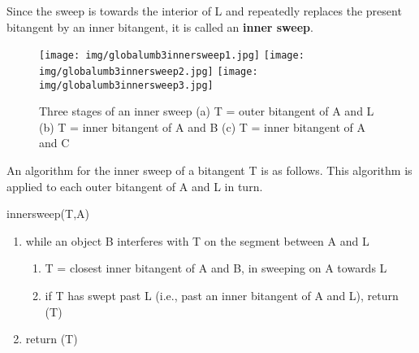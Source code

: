 \documentclass[9pt,twocolumn]{article}
\newif\ifJournal
\begin{document}

\ifJournal
  In this case, the global umbra of A is set to the penumbra of A,
  which is declared to be the maximal size of the global umbra.\footnote{The only
    points that can be blocked from L by A are the points inside the
    penumbra of A.  The responsibility for blocking L is rightly passed
    to another object when the point leaves A's penumbra.}
\fi

Since the sweep is towards the interior of L and repeatedly 
replaces the present bitangent by an inner bitangent,
it is called an {\bf inner sweep}.

\begin{figure}
\begin{center}
\texttt{[image: img/globalumb3innersweep1.jpg]}
\texttt{[image: img/globalumb3innersweep2.jpg]}
\texttt{[image: img/globalumb3innersweep3.jpg]}
\end{center}
\caption{Three stages of an inner sweep
	 (a) T = outer bitangent of A and L
	 (b) T = inner bitangent of A and B
	 (c) T = inner bitangent of A and C}
\label{fig:innersweep}
\end{figure}

An algorithm for the inner sweep of a bitangent T is as follows.
This algorithm is applied to each outer bitangent of A and L in turn.

\vspace{.1in}

\centerline{innersweep(T,A)}

\begin{enumerate}
\item while an object B interferes with T on the segment between A and L
\begin{enumerate}
\item T = closest inner bitangent of A and B, in sweeping on A towards L
\item if T has swept past L (i.e., past an inner bitangent of A and L), return (T)

\end{enumerate}
\item return (T)
\end{enumerate}
\end{document}
